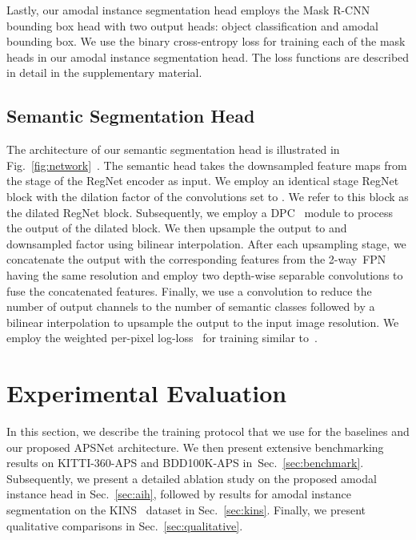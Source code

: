\documentclass[10pt,twocolumn,letterpaper]{article}
\newcommand{\secref}[1]{Sec.~\ref{#1}}
\newcommand{\figref}[1]{Fig.~\ref{#1}}
\begin{document}
Lastly, our amodal instance segmentation head employs the Mask R-CNN bounding box head with two output heads: object classification and amodal bounding box. We use the binary cross-entropy loss for training each of the mask heads in our amodal instance segmentation head. The loss functions are described in detail in the supplementary material.

\subsection{Semantic Segmentation Head}

The architecture of our semantic segmentation head is illustrated in \figref{fig:network}~. The semantic head takes the  downsampled feature maps from the stage  of the RegNet encoder as input. We employ an identical stage  RegNet block with the dilation factor of the  convolutions set to . We refer to this block as the dilated RegNet block. Subsequently, we employ a DPC~\cite{chen2018searching} module to process the output of the dilated block. We then upsample the output to  and  downsampled factor using bilinear interpolation. After each upsampling stage, we concatenate the output with the corresponding features from the \mbox{2-way FPN} having the same resolution and employ two  depth-wise separable convolutions to fuse the concatenated features. Finally, we use a  convolution to reduce the number of output channels to the number of semantic classes followed by a bilinear interpolation to upsample the output to the input image resolution. We employ the weighted per-pixel log-loss~\cite{bulo2017loss} for training similar to~\cite{mohan2020efficientps}.
  
\section{Experimental Evaluation}
In this section, we describe the training protocol that we use for the baselines and our proposed \mbox{APSNet} architecture. We then present extensive benchmarking results on KITTI-360-APS and BDD100K-APS in~\secref{sec:benchmark}. Subsequently, we present a detailed ablation study on the proposed amodal instance head in \secref{sec:aih}, followed by results for amodal instance segmentation on the KINS~\cite{qi2019amodal} dataset in \secref{sec:kins}. Finally, we present qualitative comparisons in \secref{sec:qualitative}.
\end{document}
